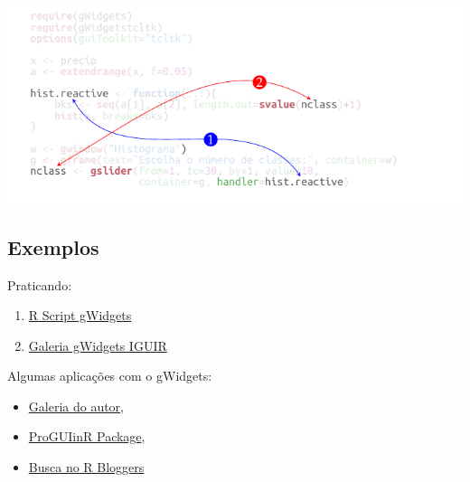 \begin{frame}
\includegraphics[scale=1]{./tikz/hist_slider_gWidgets-2.pdf}
\end{frame}


\subsection*{Exemplos}

\begin{frame}
 Praticando:
  
  \begin{enumerate}
    \itemsep1pt\parskip0pt
  \item
    \href{run:./R/gWidgets/gWidgets.R}{R Script gWidgets}
  \item 
	\href{run:gWidgets.html}{Galeria gWidgets IGUIR}
  \end{enumerate}

  Algumas aplicações com o gWidgets:
  \begin{itemize}
    \itemsep1pt\parskip0pt
  \item \href{http://cran.r-project.org/web/packages/gWidgets/vignettes/}{Galeria
      do autor},
  \item \href{https://github.com/jverzani/ProgGUIinR}{ProGUIinR Package},
  \item \href{http://www.r-bloggers.com/?s=gWidgets}{Busca no R
      Bloggers}
  \end{itemize}
\end{frame}

